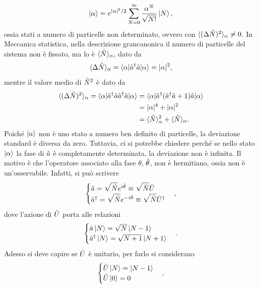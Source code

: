 \begin{equation}
    \ket{\alpha} = e^{|\alpha|^2/2}\sum_{N=0}^\infty\frac{\alpha^N}{\sqrt{N!}}\ket{N},
\end{equation}
ossia stati a numero di particelle non determinato, ovvero con $\langle (\Delta\hat{N})^2 \rangle_\alpha \neq 0$. In Meccanica statistica, nella descrizione grancanonica il numero di particelle del sistema non è fissato, ma lo è $\langle \hat{N} \rangle_\alpha$, dato da
\begin{equation}
    \langle \Delta\hat{N} \rangle_\alpha = \langle \alpha | \hat{a}^\dagger\hat{a} | \alpha \rangle = |\alpha|^2,
\end{equation}
mentre il valore medio di $\hat{N}^2$ è dato da
\begin{equation}
    \begin{split}
        \langle (\Delta\hat{N})^2 \rangle_\alpha = \langle \alpha | \hat{a}^\dagger\hat{a}\hat{a}^\dagger\hat{a} | \alpha \rangle &= \langle \alpha | \hat{a}^\dagger(\hat{a}^\dagger\hat{a} + 1)\hat{a} | \alpha \rangle \\
        &= |\alpha|^4 + |\alpha|^2 \\
        &= \langle \hat{N} \rangle_\alpha^2 + \langle \hat{N} \rangle_\alpha.
    \end{split} 
\end{equation}
Poiché $\ket{\alpha}$ non è uno stato a numero ben definito di particelle, la deviazione standard è diversa da zero. Tuttavia, ci si potrebbe chiedere perché se nello stato $\ket{\alpha}$ la fase di $\hat{a}$ è completamente determinata, la deviazione non è infinita. Il motivo è che l'operatore associato alla fase $\theta$, $\hat{\theta}$, non è hermitiano, ossia non è un'osservabile. Infatti, si può scrivere
\begin{equation}
    \begin{cases}
        \hat{a} = \sqrt{\hat{N}}e^{i\hat{\theta}} \equiv \sqrt{\hat{N}}\hat{U} \\
        \hat{a}^\dagger = \sqrt{\hat{N}}e^{-i\hat{\theta}} \equiv \sqrt{\hat{N}}\hat{U}^\dagger
    \end{cases},
\end{equation}
dove l'azione di $\hat{U}$ porta alle relazioni
\begin{equation}
    \begin{cases}
        \hat{a}\ket{N} = \sqrt{N}\ket{N - 1} \\
        \hat{a}^\dagger\ket{N} = \sqrt{N + 1}\ket{N + 1}
    \end{cases}.
\end{equation}
Adesso si deve capire se $\hat{U}$ è unitario, per farlo si considerano 
\begin{equation}
    \begin{cases}
        \hat{U}\ket{N} = \ket{N - 1} \\
        \hat{U}\ket{0} = 0
    \end{cases},
\end{equation}
